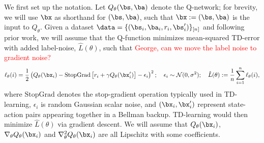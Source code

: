 We first set up the notation. Let $Q_\theta(\bs, \ba)$ denote the Q-network; for brevity, we will use $\bx$ as shorthand for $(\bs, \ba)$, such that $\bx := (\bs, \ba)$ is the input to $Q_\theta$. Given a dataset $\data = \{(\bs_i, \ba_i, r_i, \bs'_i)\}_{[n]}$ and following prior work,
we will assume that the Q-function minimizes  mean-squared TD-error with added label-noise, $\hat{L}(\theta)$, such that \textcolor{red}{George, can we move the label noise to gradient noise?}
\begin{equation*}
    \ell_\theta(i) = \frac{1}{2} \left(Q_\theta(\bx_i) - \mathrm{StopGrad}\left[r_i + \gamma Q_\theta(\bx'_i) \right] - \epsilon_i \right)^2; ~~~\epsilon_i \sim \mathcal{N}(0, \sigma^2); ~~~ \hat{L}(\theta) := \frac{1}{n}\sum_{i=1}^n \ell_\theta(i),
\end{equation*}
where $\mathrm{StopGrad}$ denotes the stop-gradient operation typically used in TD-learning, $\epsilon_i$ is random Gaussian scalar noise, and $(\bx_i, \bx'_i)$ represent state-action pairs appearing together in a Bellman backup.
TD-learning would then minimize $\hat{L}(\theta)$ via gradient descent. We will assume that $Q_\theta(\bx_i)$,  $\nabla_\theta Q_\theta(\bx_i)$ and $\nabla^2_\theta Q_\theta(\bx_i)$ are all Lipschitz with some coefficients. 



